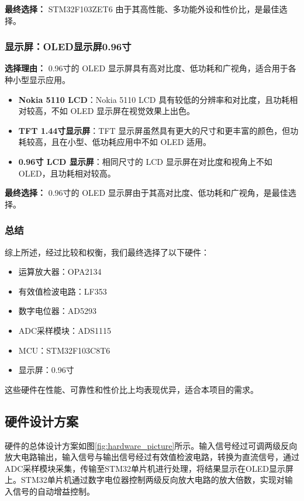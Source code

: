 \documentclass[lang=cn,11pt,a4paper]{elegantpaper}
\begin{document}
\textbf{最终选择：} STM32F103ZET6 由于其高性能、多功能外设和性价比，是最佳选择。

\subsubsection{显示屏：OLED显示屏0.96寸}
\textbf{选择理由：} 0.96寸的 OLED 显示屏具有高对比度、低功耗和广视角，适合用于各种小型显示应用。

\begin{itemize}
  \item \textbf{Nokia 5110 LCD}：Nokia 5110 LCD 具有较低的分辨率和对比度，且功耗相对较高，不如 OLED 显示屏在视觉效果上出色。
  \item \textbf{TFT 1.44寸显示屏}：TFT 显示屏虽然具有更大的尺寸和更丰富的颜色，但功耗较高，且在小型、低功耗应用中不如 OLED 适用。
  \item \textbf{0.96寸 LCD 显示屏}：相同尺寸的 LCD 显示屏在对比度和视角上不如 OLED，且功耗相对较高。
\end{itemize}

\textbf{最终选择：} 0.96寸的 OLED 显示屏由于其高对比度、低功耗和广视角，是最佳选择。

\subsubsection{总结}

综上所述，经过比较和权衡，我们最终选择了以下硬件：
\begin{itemize}
  \item 运算放大器：OPA2134
  \item 有效值检波电路：LF353
  \item 数字电位器：AD5293
  \item ADC采样模块：ADS1115
  \item MCU：STM32F103C8T6
  \item 显示屏：0.96寸
\end{itemize}

这些硬件在性能、可靠性和性价比上均表现优异，适合本项目的需求。

\subsection{硬件设计方案}
硬件的总体设计方案如图\ref{fig:hardware_picture}所示。输入信号经过可调两级反向放大电路输出，输入信号与输出信号经过有效值检波电路，转换为直流信号，通过ADC采样模块采集，传输至STM32单片机进行处理，将结果显示在OLED显示屏上。STM32单片机通过数字电位器控制两级反向放大电路的放大倍数，实现对输入信号的自动增益控制。
\end{document}
